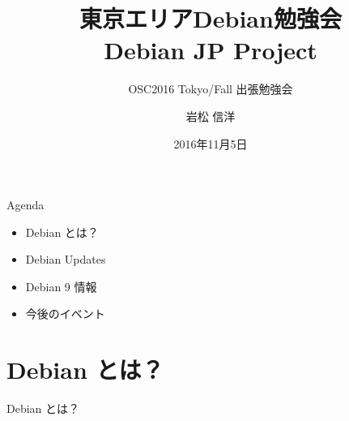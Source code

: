 \title{東京エリアDebian勉強会\\Debian JP Project}
\subtitle{OSC2016 Tokyo/Fall 出張勉強会}
\author{岩松 信洋}
\date{2016年11月5日}



\begin{frame}
\titlepage{}
\end{frame}

\begin{frame}{Agenda}
  \begin{itemize}
   \item Debian とは？
   \item Debian Updates
   \item Debian 9 情報
   \item 今後のイベント
  \end{itemize}
\end{frame}

\section{Debian とは？}
\begin{frame}\begin{center}\Huge{Debian とは？}\end{center}\end{frame}

